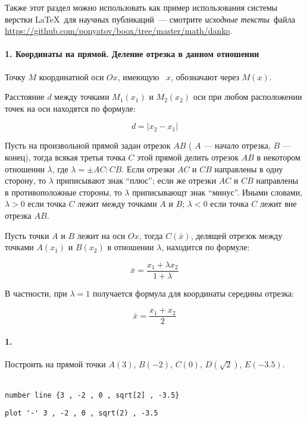 \bigskip
Также этот раздел можно использовать как пример использования системы верстки
\LaTeX\ для научных публикаций\ --- смотрите \emph{исходные тексты}\ файла
\url{https://github.com/ponyatov/boox/tree/master/math/danko}. 

\secdown


\paragraph{1. Координаты на прямой. Деление отрезка в данном отношении}

Точку $M$ координатной оси $Ox$, имеющую \ $x$,
обозначают через $M(x)$.

Расстояние $d$ между точками $M_{1}(x_{1})$ и $M_{2}(x_{2})$ оси при любом
расположении точек на оси находятся по формуле:

\begin{equation}
d=|x_{2}-x_{1}|
\end{equation}

Пусть на произвольной прямой задан отрезок $AB$ ( $A$ --- начало отрезка, $B$
--- конец), тогда всякая третья точка $C$ этой прямой делить отрезок $AB$ в
некотором отношении $\lambda$, где $\lambda= \pm AC:CB$. Если отрезки $AC$ и
$CB$ направлены в одну сторону, то $\lambda$ приписывают знак ``плюс''; если же
отрезки $AC$ и $CB$ направлены в противоположные стороны, то $\lambda$
приписывающт знак ``минус''. Иными словами, $\lambda>0$ если точка $C$ лежит
между точками $A$ и $B$; $\lambda < 0$ если точка $C$ лежит вне отрезка $AB$.

Пусть точки $A$ и $B$ лежит на оси $Ox$, тогда  $C(\bar{x})$, делящей отрезок между точками $A(x_1)$ и
$B(x_2)$ в отношении $\lambda$, находится по формуле:

\begin{equation}
\bar x=\frac{x_1+\lambda x_2}{1+\lambda}
\end{equation}

В частности, при $\lambda=1$ получается формула для координаты середины отрезка:

\begin{equation}
\bar x = \frac{x_1+x_2}{2}
\end{equation}

\paragraph{1.}

Построить на прямой точки $A(3)$, $B(-2)$, $C(0)$, $D(\sqrt{2})$, $E(-3.5)$.

\bigskip\wolfram\bigskip\\
\verb|number line {3 , -2 , 0 , sqrt[2] , -3.5}|

\bigskip\gnuplot
\begin{verbatim}
plot '-' 3 , -2 , 0 , sqrt(2) , -3.5
\end{verbatim}

\secup



\secup